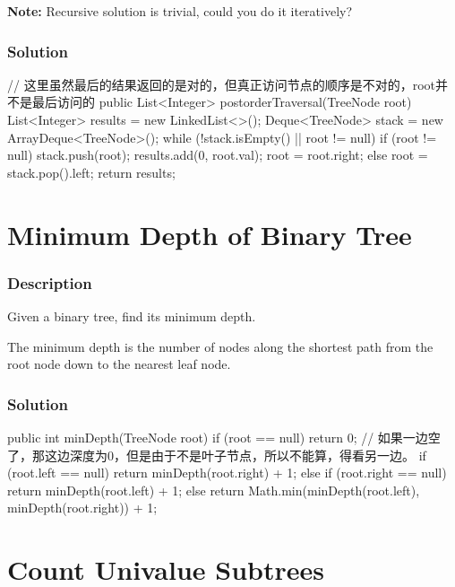 \textbf{Note:} Recursive solution is trivial, could you do it iteratively?

\subsubsection{Solution}

\begin{Code}
// 这里虽然最后的结果返回的是对的，但真正访问节点的顺序是不对的，root并不是最后访问的
public List<Integer> postorderTraversal(TreeNode root) {
    List<Integer> results = new LinkedList<>();
    Deque<TreeNode> stack = new ArrayDeque<TreeNode>();
    while (!stack.isEmpty() || root != null) {
        if (root != null) {
            stack.push(root);
            results.add(0, root.val);
            root = root.right;
        } else {
            root = stack.pop().left;
        }
    }
    return results;
}
\end{Code}

\newpage

\section{Minimum Depth of Binary Tree} %

\subsubsection{Description}
Given a binary tree, find its minimum depth.

The minimum depth is the number of nodes along the shortest path from the root node down to the nearest leaf node.

\subsubsection{Solution}

\begin{Code}
public int minDepth(TreeNode root) {
    if (root == null) {
        return 0;
    }
    // 如果一边空了，那这边深度为0，但是由于不是叶子节点，所以不能算，得看另一边。
    if (root.left == null) {
        return minDepth(root.right) + 1;
    } else if (root.right == null) {
        return minDepth(root.left) + 1;
    } else {
        return Math.min(minDepth(root.left), minDepth(root.right)) + 1;
    }
}
\end{Code}

\newpage

\section{Count Univalue Subtrees} %

